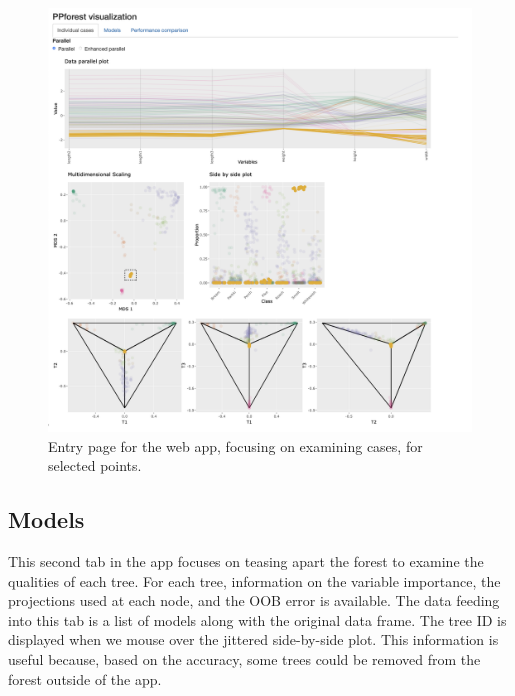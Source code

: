 \documentclass[smallextended,natbib]{svjour3}\usepackage[]{graphicx}\usepackage[]{xcolor}
\begin{document}
\begin{figure}[hbpt]
\centering
\includegraphics[width=1.1\linewidth]{tab1com2.png}
\caption{Entry page for the web app, focusing on examining cases, for selected points.  \label{tab1comp}}
\end{figure}

\subsection{Models}

This second tab in the app focuses on teasing apart the forest to examine the qualities of each tree. For each tree, information on the variable importance, the projections used at each node, and the OOB error is available. The data feeding into this tab is a list of models along with the original data frame.
The tree ID is displayed when we mouse over the jittered side-by-side plot. This information is useful because, based on the accuracy, some trees could be removed from the forest outside of the app.
\end{document}
